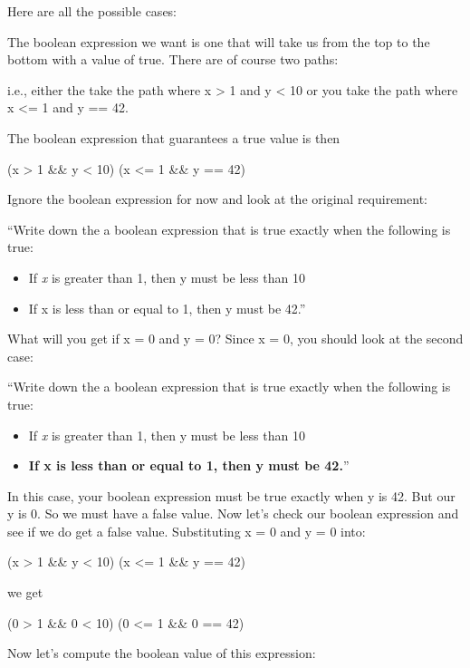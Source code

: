 \documentclass[
]{article}
\providecommand{\tightlist}{%
  \setlength{\itemsep}{0pt}\setlength{\parskip}{0pt}}
\begin{document}
Here are all the possible cases:

The boolean expression we want is one that will take us from the top to
the bottom with a value of true. There are of course two paths:

i.e., either the take the path where x \textgreater{} 1 and y
\textless{} 10 or you take the path where x \textless= 1 and y == 42.

The boolean expression that guarantees a true value is then

(x \textgreater{} 1 \&\& y \textless{} 10) \textbar\textbar{} (x
\textless= 1 \&\& y == 42)

Ignore the boolean expression for now and look at the original
requirement:

``Write down the a boolean expression that is true exactly when the
following is true:

\begin{itemize}
\tightlist
\item
  If \emph{x} is greater than 1, then y must be less than 10
\item
  If x is less than or equal to 1, then y must be 42.''
\end{itemize}

What will you get if x = 0 and y = 0? Since x = 0, you should look at
the second case:

``Write down the a boolean expression that is true exactly when the
following is true:

\begin{itemize}
\tightlist
\item
  If \emph{x} is greater than 1, then y must be less than 10
\item
  \textbf{If x is less than or equal to 1, then y must be 42.}''
\end{itemize}

In this case, your boolean expression must be true exactly when y is 42.
But our y is 0. So we must have a false value. Now let's check our
boolean expression and see if we do get a false value. Substituting x =
0 and y = 0 into:

(x \textgreater{} 1 \&\& y \textless{} 10) \textbar\textbar{} (x
\textless= 1 \&\& y == 42)

we get

(0 \textgreater{} 1 \&\& 0 \textless{} 10) \textbar\textbar{} (0
\textless= 1 \&\& 0 == 42)

\emph{\hfill\break
}Now let's compute the boolean value of this expression:
\end{document}
